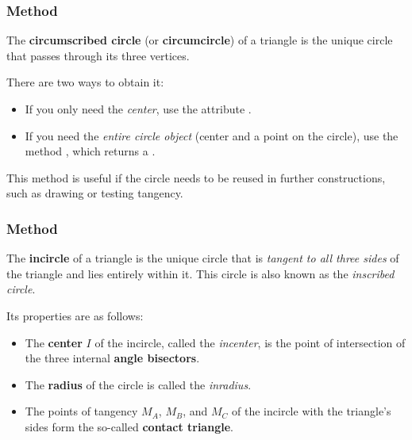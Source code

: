 \subsubsection{Method } %
\label{ssub:method_triangle_circum_circle}

The \textbf{circumscribed circle} (or \textbf{circumcircle}) of a triangle is the unique circle that passes through its three vertices.

\medskip
\noindent
There are two ways to obtain it:
\begin{itemize}
  \item If you only need the \emph{center}, use the attribute .
  \item If you need the \emph{entire circle object} (center and a point on the circle), use the method , which returns a .
\end{itemize}

\noindent
This method is useful if the circle needs to be reused in further constructions, such as drawing or testing tangency.

\vspace{1em}

\begin{tkzexample}[latex=.5\textwidth]
\begin{center}
\end{center}
\end{tkzexample}

\subsubsection{Method } %
\label{ssub:method_triangle_in_circle}

The \textbf{incircle} of a triangle is the unique circle that is \emph{tangent to all three sides} of the triangle and lies entirely within it. This circle is also known as the \emph{inscribed circle}.

\medskip
\noindent
Its properties are as follows:
\begin{itemize}
  \item The \textbf{center} $I$ of the incircle, called the \emph{incenter}, is the point of intersection of the three internal \textbf{angle bisectors}.
  \item The \textbf{radius} of the circle is called the \emph{inradius}.
  \item The points of tangency $M_A$, $M_B$, and $M_C$ of the incircle with the triangle's sides form the so-called \textbf{contact triangle}.
\end{itemize}

